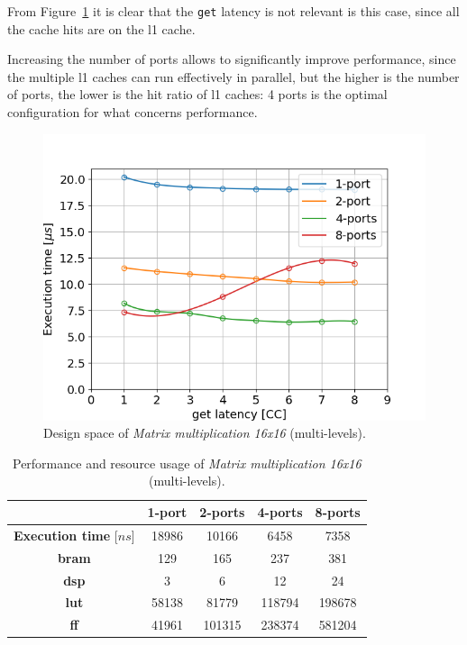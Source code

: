 \documentclass[11pt,a4paper,oneside]{memoir}
\begin{document}
From Figure~\ref{fig:matmul_16_l1_space} it is clear that the \texttt{get}
latency is not relevant is this case, since all the cache hits are on the
\ac{l1} cache.

Increasing the number of ports allows to significantly improve performance,
since the multiple \ac{l1} caches can run effectively in parallel, but the
higher is the number of ports, the lower is the hit ratio of \ac{l1} caches: 4
ports is the optimal configuration for what concerns performance.

\begin{figure}[H]
	\centering
	\includegraphics[width=.8\textwidth]{matmul_16_multiport_L1_latency}
	\caption{Design space of \emph{Matrix multiplication 16x16}
	(multi-levels).}
	\label{fig:matmul_16_l1_space}
\end{figure}

\begin{table}[H]
	\begin{center}
		\begin{tabular}{ccccc}
			\hline
			\rowcolor{gray!50}
			& \textbf{1-port} & \textbf{2-ports} & \textbf{4-ports}
			& \textbf{8-ports} \\
			\hline
			\textbf{Execution time} [$ns$] & 18986 & 10166 & 6458 &
			7358 \\
			\rowcolor{gray!25}
			\textbf{\ac{bram}} & 129 & 165 & 237 & 381 \\
			\textbf{\acs{dsp}} & 3 & 6 & 12 & 24 \\
			\rowcolor{gray!25}
			\textbf{\acs{lut}} & 58138 & 81779 & 118794 & 198678 \\
			\textbf{\acs{ff}} & 41961 & 101315 & 238374 & 581204 \\
			\hline
		\end{tabular}
	\end{center}
	\caption{Performance and resource usage of \emph{Matrix multiplication
	16x16} (multi-levels).}
	\label{tab:matmul_16_l1_ports_report}
\end{table}
\end{document}
